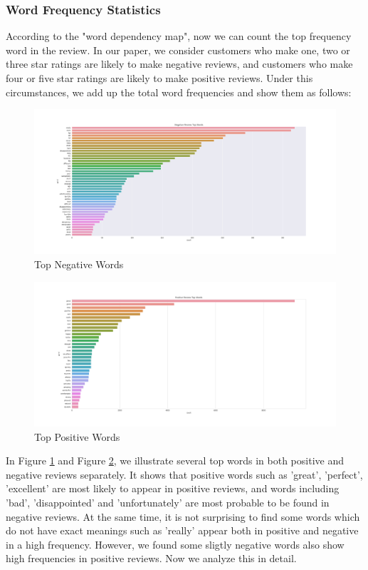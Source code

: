 \documentclass[12pt]{article}  %
\begin{document}
\subsubsection{Word Frequency Statistics}
According to the "word dependency map", now we can count the top frequency word in the review. In our paper, we consider customers who make one, two or three star ratings are likely to make negative reviews, and customers who make four or five star ratings are likely to make positive reviews. Under this circumstances, we add up the total word frequencies and show them as follows:
\begin{figure}[H]
\centering
\includegraphics[width=.9\textwidth]{negative_word.png}
\caption{Top Negative Words}\label{fig:negative}
\end{figure}
\begin{figure}[H]
\centering
\includegraphics[width=.9\textwidth]{positive_word.png}
\caption{Top Positive Words}\label{fig:positive}
\end{figure}

In Figure \ref{fig:negative} and Figure \ref{fig:positive}, we illustrate several top words in both positive and negative reviews separately. It shows that positive words such as 'great', 'perfect', 'excellent' are most likely to appear in positive reviews, and words including 'bad', 'disappointed' and 'unfortunately' are most probable to be found in negative reviews.  At the same time, it is not surprising to find some words which do not have exact meanings such as 'really' appear both in positive and negative in a high frequency. However, we found some sligtly negative words also show high frequencies in positive reviews. Now we analyze this in detail. 
\end{document}
